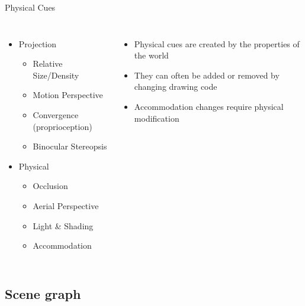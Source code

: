 \documentclass[12pt,ucs,hyperref={pdftext}]{beamer}
\begin{document}
\begin{frame}{Physical Cues}
\begin{columns}

\column{5.5cm}
\begin{itemize}
\item<uncover@0> Projection
\begin{itemize}
\item Relative Size/Density
\item Motion Perspective
\item Convergence (proprioception)
\item Binocular Stereopsis
\end{itemize}

\item Physical
\begin{itemize}
\item Occlusion
\item Aerial Perspective
\item Light \& Shading
\item Accommodation
\end{itemize}

\end{itemize}

\column{5.5cm}
\begin{itemize}%
\item Physical cues are created by the properties of the world
\item They can often be added or removed by changing drawing code
\item Accommodation changes require physical modification
\end{itemize}

\end{columns}
\end{frame}



\subsection{Scene graph}
\end{document}
